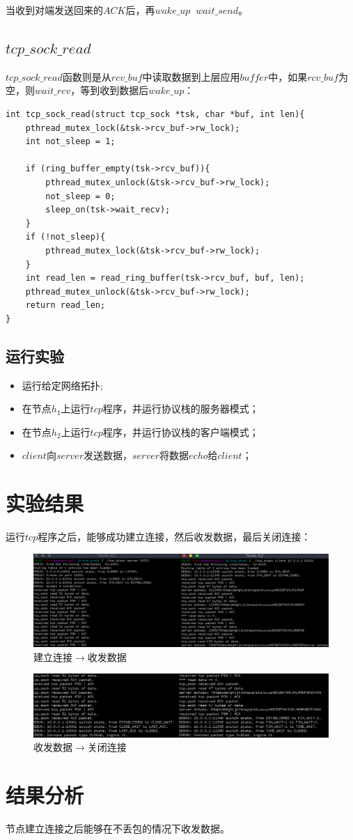 \documentclass[UTF8,noindent]{ctexart}
\begin{document}
当收到对端发送回来的$ACK$后，再$wake\_up$ $\ wait\_send$。

\subsection{$tcp\_sock\_read$}
$tcp\_sock\_read$函数则是从$rcv\_buf$中读取数据到上层应用$buffer$中，如果$rcv\_buf$为空，则$wait\_rcv$，等到收到数据后$wake\_up$：
\begin{lstlisting}
int tcp_sock_read(struct tcp_sock *tsk, char *buf, int len){
	pthread_mutex_lock(&tsk->rcv_buf->rw_lock);
	int not_sleep = 1;

	if (ring_buffer_empty(tsk->rcv_buf)){
		pthread_mutex_unlock(&tsk->rcv_buf->rw_lock);
		not_sleep = 0;
		sleep_on(tsk->wait_recv);
	}
	if (!not_sleep){
		pthread_mutex_lock(&tsk->rcv_buf->rw_lock);
	}
	int read_len = read_ring_buffer(tsk->rcv_buf, buf, len);
	pthread_mutex_unlock(&tsk->rcv_buf->rw_lock);
	return read_len;
}
\end{lstlisting}

\subsection{运行实验}
\begin{itemize}
  \item 运行给定网络拓扑;
	\item 在节点$h_1$上运行$tcp$程序，并运行协议栈的服务器模式；
	  \item 在节点$h_2$上运行$tcp$程序，并运行协议栈的客户端模式；
		\item $client$向$server$发送数据，$server$将数据$echo$给$client$；
\end{itemize}

\section{{实验结果}}
运行$tcp$程序之后，能够成功建立连接，然后收发数据，最后关闭连接：
\begin{figure}[H]
  \centering
  \includegraphics[scale=0.35]{1.png}
  \caption{建立连接$\rightarrow$收发数据}
\end{figure}

\begin{figure}[H]
  \centering
  \includegraphics[scale=0.4]{2.png}
  \caption{收发数据$\rightarrow$关闭连接}
\end{figure}


\section{{结果分析}}

节点建立连接之后能够在不丢包的情况下收发数据。
\end{document}
